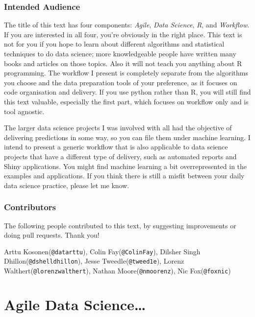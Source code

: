 \documentclass[]{book}
\begin{document}
\hypertarget{intended-audience}{%
\section{Intended Audience}\label{intended-audience}}

The title of this text has four components: \emph{Agile}, \emph{Data Science}, \emph{R}, and \emph{Workflow}.
If you are interested in all four, you're obviously in the right place.
This text is not for you if you hope to learn about different algorithms and statistical techniques to do data science; more knowledgeable people have written many books and articles on those topics.
Also it will not teach you anything about R programming.
The workflow I present is completely separate from the algorithms you choose and the data preparation tools of your preference, as it focuses on code organisation and delivery.
If you use python rather than R, you will still find this text valuable, especially the first part, which focuses on workflow only and is tool agnostic.

The larger data science projects I was involved with all had the objective of delivering predictions in some way, so you can file them under machine learning.
I intend to present a generic workflow that is also applicable to data science projects that have a different type of delivery, such as automated reports and Shiny applications.
You might find machine learning a bit overrepresented in the examples and applications.
If you think there is still a misfit between your daily data science practice, please let me know.

\hypertarget{contributors}{%
\section{Contributors}\label{contributors}}

The following people contributed to this text, by suggesting improvements or doing pull requests. Thank you!

Arttu Kosonen(\texttt{@datarttu}), Colin Fay(\texttt{@ColinFay}), Dilsher Singh Dhillon(\texttt{@dshelldhillon}), Jesse Tweedle(\texttt{@tweed1e}), Lorenz Walthert(\texttt{@lorenzwalthert}), Nathan Moore(\texttt{@nmoorenz}), Nic Fox(\texttt{@foxnic})

\hypertarget{part-agile-data-science}{%
\part{Agile Data Science\ldots{}}\label{part-agile-data-science}}
\end{document}
